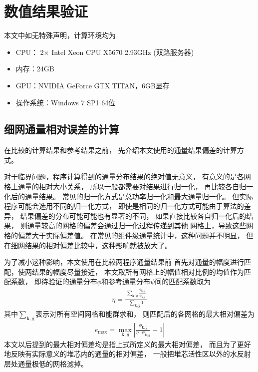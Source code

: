 \section{数值结果验证}

本文中如无特殊声明，计算环境均为
\begin{itemize}
\item CPU： 2$\times$ Intel Xeon CPU X5670 2.93GHz (双路服务器)
\item 内存：24GB
\item GPU：NVIDIA GeForce GTX TITAN，6GB显存
\item 操作系统：Windows 7 SP1 64位
\end{itemize}

\subsection{细网通量相对误差的计算}
在比较\ProgramName 的计算结果和参考结果之前，
先介绍本文使用的通量结果偏差的计算方式。

对于临界问题，程序计算得到的通量分布结果的绝对值无意义，
有意义的是各网格上通量的相对大小关系，
所以一般都需要对结果进行归一化，
再比较各自归一化后的通量结果。
常见的归一化方式是总功率归一化和最大通量归一化。
但实际程序可能会选用不同的归一化方式，
即使是相同的归一化方式可能由于算法的差异，
结果偏差的分布可能可能也有显著的不同，
如果直接比较各自归一化后的结果，
则通量较高的网格的偏差会通过归一化过程传递到其他
网格上，导致这些网格的偏差大于实际偏差值。
在常见的组件级通量统计中，这种问题并不明显，
但在细网结果的相对偏差比较中，这种影响就被放大了。

为了减小这种影响，本文使用在比较两程序通量结果前
首先对通量的幅度进行匹配，使两结果的幅度尽量接近，
本文取所有网格上的幅值相对比例的均值作为匹配系数，
即待验证的通量分布$\phi$和参考通量分布$\psi$间的匹配系数取为
\begin{align}
  \eta = \frac{\ \displaystyle\sum_{\bm{k},g}\frac{\phi_{\bm{k},g}}{\psi_{\bm{k},g}}\ }
              {\displaystyle\sum_{\bm{k},g}1}
\end{align}
其中$\displaystyle\sum_{\bm{k},g}$表示对所有空间网格和能群求和，
则匹配后的各网格的最大相对偏差为
\begin{align}
  e_\mathrm{max} = \max_{\bm{k},g}
      \left|
        \frac{\phi_{\bm{k},g}}{\eta\cdot\psi_{\bm{k},g}} - 1
      \right|
\end{align}
本文以后提到的最大相对偏差均是指上式所定义的最大相对偏差，
而且为了更好地反映有实际意义的堆芯内的通量的相对偏差，
一般把堆芯活性区以外的水反射层处通量极低的网格滤掉。

